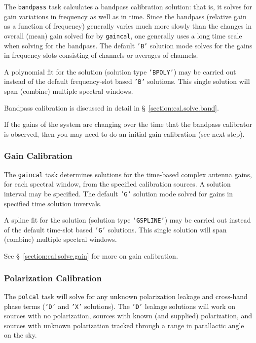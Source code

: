 The {\tt bandpass} task
calculates a bandpass calibration solution: that is, it solves for
gain variations in frequency as well as in time.   Since the bandpass
(relative gain as a function of frequency) generally varies much more slowly 
than the changes in overall (mean) gain solved for by {\tt gaincal}, one
generally uses a long time scale when solving for the bandpass. The
default {\tt 'B'} solution mode solves for the gains in frequency
slots consisting of channels or averages of channels.

A polynomial fit for the solution (solution type {\tt 'BPOLY'}) may be
carried out instead of the default frequency-slot based {\tt 'B'}
solutions.  This single solution will span (combine) multiple spectral
windows.

Bandpass calibration is discussed in detail in
\S~\ref{section:cal.solve.band}.

If the gains of the system are changing over the time that the
bandpass calibrator is observed, then you may need to do an initial
gain calibration (see next step).

\subsubsection{Gain Calibration}
\label{section:intro.walkthru.calib.gaincal}

The {\tt gaincal} task determines solutions for the time-based complex
antenna gains, for each spectral window, from the specified
calibration sources.  A solution interval may be specified. The
default {\tt 'G'} solution mode solved for gains in specified
time solution invervals.

A spline fit for the solution (solution type {\tt 'GSPLINE'}) may be
carried out instead of the default time-slot based {\tt 'G'} solutions.
This single solution will span (combine) multiple spectral windows.

See \S~\ref{section:cal.solve.gain} for more on gain calibration.

\subsubsection{Polarization Calibration}
\label{section:intro.walkthru.calib.polcal}

The {\tt polcal} task will solve for any unknown polarization leakage
and cross-hand phase terms ({\tt 'D'} and {\tt 'X'} solutions).  The
{\tt 'D'} leakage solutions will work on sources with no polarization, sources
with known (and supplied) polarization, and sources with unknown
polarization tracked through a range in parallactic angle on the sky.


